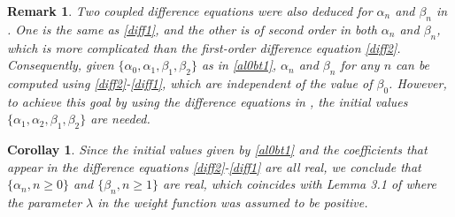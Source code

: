 \documentclass[11pt,a4paper]{article}
\newtheorem{corollary}[theorem]{Corollay}
\newtheorem{remark}[theorem]{Remark}
\numberwithin{equation}{section}
\begin{document}
\begin{remark}
Two coupled difference equations were also deduced for $\alpha_n$ and $\beta_n$ in \cite[Theorem 3.5]{MCM}. One is the same as \eqref{diff1}, and the other is of second order in both $\alpha_n$ and $\beta_n$, which is more complicated than the first-order difference equation \eqref{diff2}. Consequently, given $\{\alpha_0,\alpha_1,\beta_1,\beta_2\}$ as in \eqref{al0bt1}, $\alpha_n$ and $\beta_n$ for any $n$ can be computed using \eqref{diff2}-\eqref{diff1}, which are independent of the value of $\beta_0$. However, to achieve this goal by using the difference equations in \cite{MCM}, the initial values $\{\alpha_1,\alpha_2,\beta_1,\beta_2\}$ are needed.
\end{remark}

\begin{corollary}
Since the initial values given by \eqref{al0bt1} and the coefficients that appear in the difference equations \eqref{diff2}-\eqref{diff1} are all real, we conclude that $\{\alpha_n,n\geq0\}$ and $\{\beta_n, n\geq1\}$ are real, which coincides with Lemma 3.1 of \cite{MCS} where the parameter $\lambda$ in the weight function was assumed to be positive.
\end{corollary}
\end{document}
